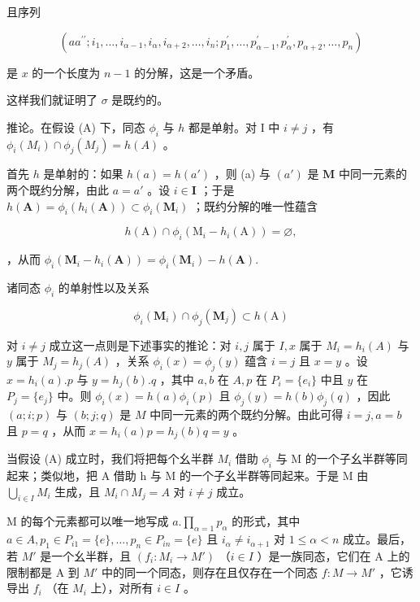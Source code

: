 且序列

\[
\left(a a ^ {\prime \prime}; i _ {1}, \dots , i _ {\alpha - 1}, i _ {\alpha}, i _ {\alpha + 2}, \dots , i _ {n}; p _ {1} ^ {\prime}, \dots , p _ {\alpha - 1} ^ {\prime}, p _ {\alpha} ^ {\prime}, p _ {\alpha + 2}, \dots , p _ {n}\right)
\]

是 \(x\) 的一个长度为 \(n - 1\) 的分解，这是一个矛盾。

这样我们就证明了 \(\sigma\) 是既约的。

推论。在假设 (A) 下，同态 \(\phi_i\) 与 \(h\) 都是单射。对 I 中 \(i \neq j\) ，有 \(\phi_i(M_i) \cap \phi_j(M_j) = h(A)\) 。

首先 \(h\) 是单射的：如果 \(h(a) = h(a')\) ，则 (a) 与 \((a')\) 是 \(\mathbf{M}\) 中同一元素的两个既约分解，由此 \(a = a'\) 。设 \(i \in \mathbf{I}\) ；于是 \(h(\mathbf{A}) = \phi_i(h_i(\mathbf{A})) \subset \phi_i(\mathbf{M}_i)\) ；既约分解的唯一性蕴含

\[
h (\mathrm{A}) \cap \phi_ {i} (\mathrm{M} _ {i} - h _ {i} (\mathrm{A})) = \varnothing ,
\]

，从而 \(\phi_{i}(\mathbf{M}_{i} - h_{i}(\mathbf{A})) = \phi_{i}(\mathbf{M}_{i}) - h(\mathbf{A}).\)

诸同态 \(\phi_{i}\) 的单射性以及关系

\[
\phi_ {i} (\mathbf {M} _ {i}) \cap \phi_ {j} (\mathbf {M} _ {j}) \subset h (\mathrm{A})
\]

对 \(i \neq j\) 成立这一点则是下述事实的推论：对 \(i, j\) 属于 \(I, x\) 属于 \(M_i = h_i(A)\) 与 \(y\) 属于 \(M_j = h_j(A)\) ，关系 \(\phi_i(x) = \phi_j(y)\) 蕴含 \(i = j\) 且 \(x = y\) 。设 \(x = h_i(a).p\) 与 \(y = h_j(b).q\) ，其中 \(a, b\) 在 \(A, p\) 在 \(P_i = \{e_i\}\) 中且 \(y\) 在 \(P_j = \{e_j\}\) 中。则 \(\phi_i(x) = h(a)\phi_i(p)\) 且 \(\phi_j(y) = h(b)\phi_j(q)\) ，因此 \((a; i; p)\) 与 \((b; j; q)\) 是 \(M\) 中同一元素的两个既约分解。由此可得 \(i = j, a = b\) 且 \(p = q\) ，从而 \(x = h_i(a)p = h_j(b)q = y\) 。

当假设 (A) 成立时，我们将把每个幺半群 \(M_{i}\) 借助 \(\phi_{i}\) 与 M 的一个子幺半群等同起来；类似地，把 A 借助 h 与 M 的一个子幺半群等同起来。于是 M 由 \(\bigcup_{i\in I}M_{i}\) 生成，且 \(M_{i}\cap M_{j}=A\) 对 \(i\neq j\) 成立。

M 的每个元素都可以唯一地写成 \(a.\prod_{\alpha=1}p_{\alpha}\) 的形式，其中 \(a\in A, p_{1}\in P_{i1}=\{e\},\ldots,p_{n}\in P_{in}=\{e\}\) 且 \(i_{\alpha}\neq i_{\alpha+1}\) 对 \(1\leqslant\alpha<n\) 成立。最后，若 \(M'\) 是一个幺半群，且 \((f_{i}:M_{i}\to M')\) （\(i\in I\) ）是一族同态，它们在 A 上的限制都是 A 到 \(M'\) 中的同一个同态，则存在且仅存在一个同态 \(f:M\to M'\) ，它诱导出 \(f_{i}\) （在 \(M_{i}\) 上），对所有 \(i\in I\) 。

